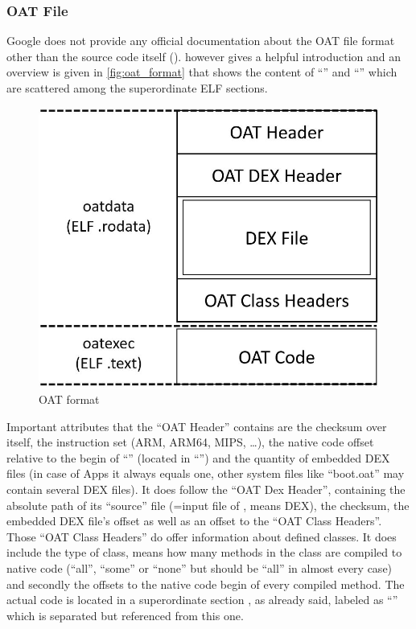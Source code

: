 \subsubsection{OAT File}\label{section:oat_file}
Google does not provide any official documentation about the OAT
file format other than the source code itself
(). \parencite{hiding_behind_art}
however gives a helpful introduction and an overview is given
in \autoref{fig:oat_format} that shows the content of ``'' and
``'' which are scattered among the superordinate ELF sections.

\begin{figure}[htb]
  \centering
  \includegraphics[scale=0.4]{figures/oat_format}
  \caption[OAT format]{OAT format}
  \label{fig:oat_format}
\end{figure}

Important attributes that the ``OAT Header'' contains are the
checksum over itself,
the instruction set (ARM, ARM64, MIPS, \ldots), the native code
offset relative to the begin of ``'' (located in
``'') and the quantity of embedded
DEX files (in case of Apps it always equals one, other system files like
``boot.oat'' may contain several DEX files). It does follow the
``OAT Dex Header'', containing
the absolute path of its ``source'' file (=input file of ,
means DEX), the checksum, the
embedded DEX file's offset as well as
an offset to the ``OAT Class Headers''. Those ``OAT Class Headers''
do offer information about defined classes. It does include the type
of class, means how many methods in the class
are compiled to native code (``all'', ``some'' or ``none'' but
should be ``all'' in almost every case) and secondly
the offsets to the native code begin of every compiled method.
The actual code is located in a superordinate section
, as already said, labeled as ``'' which is separated but referenced from this one.

